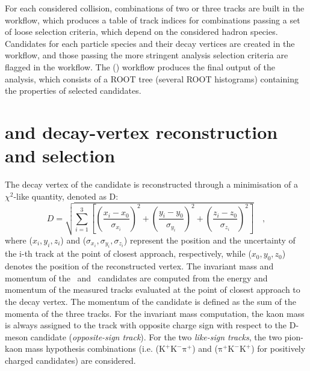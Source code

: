 For each considered collision, combinations of two or three tracks are built in the  workflow, which produces a table of track indices for combinations passing a set of loose selection criteria, which depend on the considered hadron species. Candidates for each particle species and their decay vertices are created in the  workflow, and those passing the more stringent analysis selection criteria are flagged in the  workflow. The  () workflow produces the final output of the analysis, which consists of a ROOT tree (several ROOT histograms) containing the properties of selected candidates.

\section{\texorpdfstring{\ds and \dpl decay-vertex reconstruction and selection}{Ds+ and D+ decay-vertex reconstruction and selection}}
 The decay vertex of the candidate is reconstructed through a minimisation of a $\chi^2$-like quantity, denoted as D:
\begin{equation*}
    D = \sqrt{\sum_{i=1}^3 \left[\left(\frac{x_i-x_0}{\sigma_{x_i}}\right)^2 + \left(\frac{y_i-y_0}{\sigma_{y_i}}\right)^2 +\left(\frac{z_i-z_0}{\sigma_{z_i}}\right)^2\right]}\quad ,
\end{equation*}
where ($x_i,y_i,z_i$) and ($\sigma_{x_i},\sigma_{y_i},\sigma_{z_i}$) represent the position and the uncertainty of the i-th track at the point of closest approach, respectively, while ($x_0,y_0,z_0$) denotes the position of the reconstructed vertex. The invariant mass and momentum of the \ds\ and \dpl\ candidates are computed from the energy and momentum of the measured tracks evaluated at the point of closest approach to the decay vertex. The momentum of the candidate is defined as the sum of the momenta of the three tracks. For the invariant mass computation, the kaon mass is always assigned to the track with opposite charge sign with respect to the D-meson candidate (\emph{opposite-sign track}). For the two \emph{like-sign tracks}, the two pion-kaon mass hypothesis combinations \big(i.e. ($\mathrm{K^+K^-\pi^+}$) and ($\mathrm{\pi^+K^-K^+}$) for positively charged candidates\big) are considered. 

